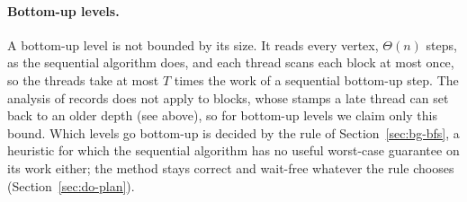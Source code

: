 \paragraph{Bottom-up levels.} A bottom-up level is not bounded by its size. It reads every vertex, $\Theta(n)$ steps, as the sequential algorithm does, and each thread scans each block at most once, so the threads take at most $T$ times the work of a sequential bottom-up step. The analysis of records does not apply to blocks, whose stamps a late thread can set back to an older depth (see above), so for bottom-up levels we claim only this bound. Which levels go bottom-up is decided by the rule of Section~\ref{sec:bg-bfs}, a heuristic for which the sequential algorithm has no useful worst-case guarantee on its work either; the method stays correct and wait-free whatever the rule chooses (Section~\ref{sec:do-plan}).
